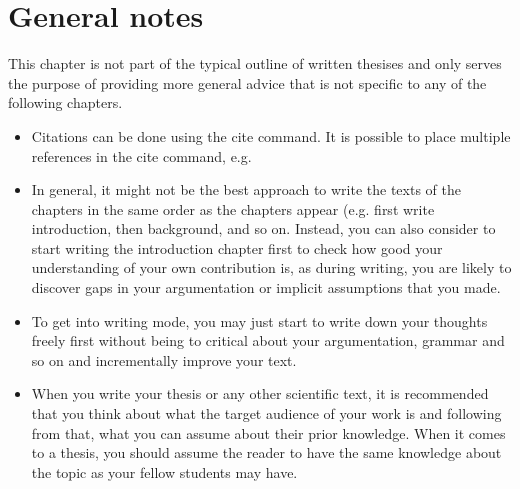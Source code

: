 
\chapter{General notes}%
\label{cha:general_notes}

This chapter is not part of the typical outline of written thesises and only serves the purpose of providing more general advice that is not specific to any of the following chapters.

\begin{itemize}
\item Citations can be done using the cite command. It is possible to place multiple references in the cite command, e.g. %
\item In general, it might not be the best approach to write the texts of the chapters in the same order as the chapters appear (e.g. first write introduction, then background, and so on. Instead, you can also consider to start writing the introduction chapter first to check how good your understanding of your own contribution is, as during writing, you are likely to discover gaps in your argumentation or implicit assumptions that you made.
\item To get into writing mode, you may just start to write down your thoughts freely first without being to critical about your argumentation, grammar and so on and incrementally improve your text. 
\item When you write your thesis or any other scientific text, it is recommended that you think about what the target audience of your work is and following from that, what you can assume about their prior knowledge.
When it comes to a thesis, you should assume the reader to have the same knowledge about the topic as your fellow students may have.
\end{itemize}
